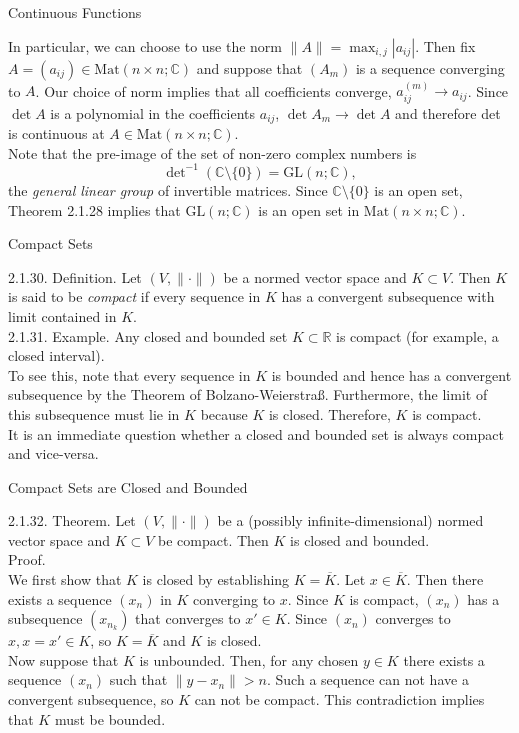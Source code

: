 \documentclass[smaller,hyperref={CJKbookmarks=true}]{beamer}
\newcommand{\C}{\mathbb{C}} \newcommand{\F}{\mathbb{F}} \newcommand{\R}{\mathbb{R}} \newcommand{\Q}{\mathbb{Q}}
\begin{document}
\begin{frame}{Continuous Functions}
\begin{spacing}{1}
In particular, we can choose to use the norm $\|A\|=\max_{i,j}|a_{ij}|$. Then fix $A=(a_{ij})\in\text{Mat}(n\times n;\C)$ and suppose that $(A_m)$ is a sequence converging to $A$. Our choice of norm implies that all coef{}ficients converge, $a_{ij}^{(m)}\to a_{ij}$. Since $\det A$ is a polynomial in the coef{}ficients $a_{ij}$, $\det A_m\to\det A$ and therefore det is continuous at $A\in\text{Mat}(n\times n;\C)$.\\
Note that the pre-image of the set of non-zero complex numbers is
\[\det\nolimits^{-1}(\C\setminus\{0\})=\text{GL}(n;\C),\]
the \emph{general linear group} of invertible matrices. Since $\C\setminus\{0\}$ is an open set, Theorem 2.1.28 implies that $\text{GL}(n;\C)$ is an open set in $\text{Mat}(n\times n;\C)$.
\end{spacing}
\end{frame}
\begin{frame}[c]{Compact Sets}
\begin{spacing}{1.1}
\alert{2.1.30. Definition.} Let $(V,\|\cdot\|)$ be a normed vector space and $K\subset V$. Then $K$ is said to be \emph{compact} if every sequence in $K$ has a convergent subsequence with limit contained in $K$.\\[7pt]
\alert{2.1.31. Example.} Any closed and bounded set $K\subset\R$ is compact (for example, a closed interval).\\[5pt]
To see this, note that every sequence in $K$ is bounded and hence has a
convergent subsequence by the Theorem of Bolzano-Weierstra\ss.
Furthermore, the limit of this subsequence must lie in $K$ because $K$ is
closed. Therefore, $K$ is compact.\\[6pt]
It is an immediate question whether a closed and bounded set is always
compact and vice-versa.
\end{spacing}
\end{frame}
\begin{frame}[t]{Compact Sets are Closed and Bounded}
\begin{spacing}{1.1}
\alert{2.1.32. Theorem.} Let $(V,\|\cdot\|)$ be a (possibly infinite-dimensional) normed vector space and $K\subset V$ be compact. Then $K$ is closed and bounded.\\[7pt]
\alert{Proof.}\\
We first show that $K$ is closed by establishing $K=\overline{K}$. Let $x\in\overline{K}$. Then there exists a sequence $(x_n)$ in $K$ converging to $x$. Since $K$ is compact, $(x_n)$ has a subsequence $(x_{n_k})$ that converges to $x'\in K$. Since $(x_n)$ converges to $x,x=x'\in K$, so $K=\overline{K}$ and $K$ is closed.\\[6pt]
Now suppose that $K$ is unbounded. Then, for any chosen $y\in K$ there exists a sequence $(x_n)$ such that $\|y-x_n\|>n$. Such a sequence can not have a convergent subsequence, so $K$ can not be compact. This contradiction implies that $K$ must be bounded.
\end{spacing}
\end{frame}
\end{document}
